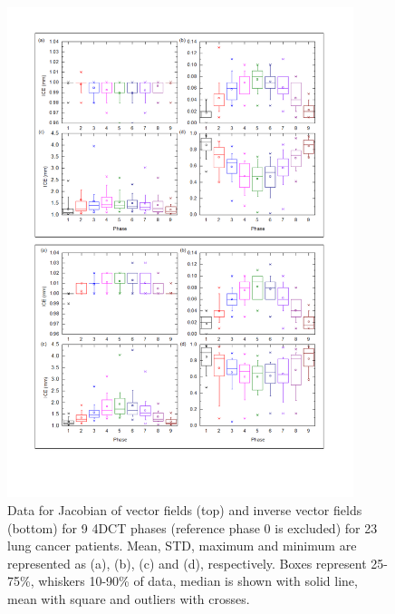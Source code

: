 \documentclass[type=dr, dr=rernat, accentcolor=tud7b,colorbacktitle, bigchapter, openright, twoside, 12pt ]{tudthesis}
\begin{document}
\begin{figure}[H]
	\begin{center}		
		\includegraphics[width=0.9\textwidth]{./Images/Jacobian_data.png}
		\caption{Data for Jacobian of vector fields (top) and inverse vector fields (bottom) for 9 4DCT phases (reference phase 0 is excluded) for 23 lung cancer patients. Mean, STD, maximum and minimum are represented as (a), (b), (c) and (d), respectively.
		Boxes represent 25-75\%, whiskers 10-90\% of data, median is shown with solid line, mean with square and outliers with crosses.}
		\label{jacobian_data}
	\end{center}
\end{figure}
\end{document}
